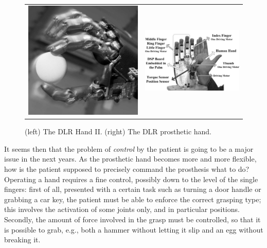 \begin{figure}
  \begin{tabular}{cc}
    \includegraphics[height=0.12\textheight]{figs/DLRHand-Ball-comp.jpg} &
    \includegraphics[height=0.12\textheight]{figs/DLR-Prothese.jpg}
  \end{tabular}
  \caption{(left) The DLR Hand II. (right) The DLR prosthetic hand.}
  \label{fig:DLRHandII}
\end{figure}

It seems then that the problem of \emph{control} by the patient is
going to be a major issue in the next years. As the prosthetic hand
becomes more and more flexible, how is the patient supposed to
precisely command the prosthesis what to do? Operating a hand requires
a fine control, possibly down to the level of the single fingers:
first of all, presented with a certain task such as turning a door
handle or grabbing a car key, the patient must be able to enforce the
correct grasping type; this involves the activation of some joints
only, and in particular positions. Secondly, the amount of force
involved in the grasp must be controlled, so that it is possible to
grab, e.g., both a hammer without letting it slip and an egg without
breaking it.

